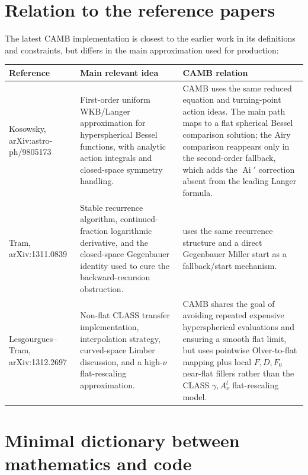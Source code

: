 \documentclass[11pt,a4paper]{article}
\newcommand{\code}[1]{\texttt{\detokenize{#1}}}
\newcommand{\Ai}{\operatorname{Ai}}
\begin{document}
\section{Relation to the reference papers}

The latest CAMB implementation is closest to the earlier work in its definitions and constraints, but differs in the main approximation used for production:
\begin{center}
\small
\begin{tabularx}{\linewidth}{Z{0.84}Z{1.11}Z{1.05}}
\toprule
Reference & Main relevant idea & CAMB relation \\
\midrule
Kosowsky, arXiv:astro-ph/9805173 \cite{kosowsky1998}
& First-order uniform WKB/Langer approximation for hyperspherical Bessel functions, with analytic action integrals and closed-space symmetry handling.
& CAMB uses the same reduced equation and turning-point action ideas.  The main path maps to a flat spherical Bessel comparison solution; the Airy comparison reappears only in the second-order fallback, which adds the \(\Ai'\) correction absent from the leading Langer formula. \\
Tram, arXiv:1311.0839 \cite{tram2013}
& Stable recurrence algorithm, continued-fraction logarithmic derivative, and the closed-space Gegenbauer identity used to cure the backward-recursion obstruction.
& \code{phi_recurs} uses the same recurrence structure and a direct Gegenbauer Miller start as a fallback/start mechanism. \\
Lesgourgues--Tram, arXiv:1312.2697 \cite{lesgourgues-tram2013}
& Non-flat \textsc{CLASS} transfer implementation, interpolation strategy, curved-space Limber discussion, and a high-\(\nu\) flat-rescaling approximation.
& CAMB shares the goal of avoiding repeated expensive hyperspherical evaluations and ensuring a smooth flat limit, but uses pointwise Olver-to-flat mapping plus local \(F,D,F_0\) near-flat fillers rather than the \textsc{CLASS} \(\gamma,A_\nu^l\) flat-rescaling model. \\
\bottomrule
\end{tabularx}
\end{center}

\section{Minimal dictionary between mathematics and code}
\end{document}
